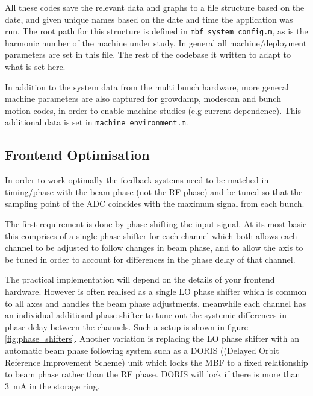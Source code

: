 \documentclass{report}
\begin{document}
All these codes save the relevant data and graphs to a file structure based on the date, and given unique names based on the date and time the application was run. The root path for this structure is defined in \verb|mbf_system_config.m|, as is the harmonic number of the machine under study. In general all machine/deployment parameters are set in this file. The rest of the codebase it written to adapt to what is set here.

In addition to the system data from the multi bunch hardware, more general machine parameters are also captured for growdamp, modescan and bunch motion codes, in order to enable machine studies (e.g current dependence). This additional data is set in \verb|machine_environment.m|.

\subsection{Frontend Optimisation}
In order to work optimally the feedback systems need to be matched in timing/phase with the beam phase (not the RF phase) and be tuned so that the sampling point of the ADC coincides with the maximum signal from each bunch.

The first requirement is done by phase shifting the input signal. At its most basic this comprises of a single phase shifter for each channel which both allows each channel to be adjusted to follow changes in beam phase, and to allow the axis to be  tuned in order to account for differences in the phase delay of that channel.

The practical implementation will depend on the details of your frontend hardware.
However is often realised as a single LO phase shifter which is common to all axes and handles the beam phase adjustments. meanwhile each channel has an individual additional phase shifter to tune out the systemic differences in phase delay between the channels. Such a setup is shown in figure \ref{fig:phase_shifters}.
Another variation is replacing the LO phase shifter with an automatic beam phase following system such as a DORIS ((Delayed Orbit Reference Improvement Scheme) unit which locks the MBF to a fixed relationship to beam phase rather than the RF phase. 
DORIS will lock if there is more than 3~mA in the storage ring.
\end{document}
